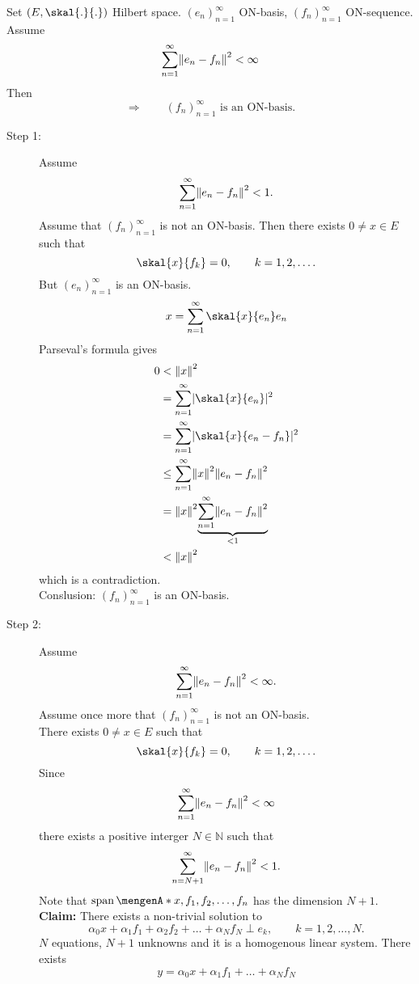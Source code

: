 \begin{example}
	Set $(E,\skal{.}{.})$ Hilbert space. $(e_n)_{n=1}^{\infty}$ ON-basis, $(f_n)_{n=1}^{\infty}$ ON-sequence. \\
	Assume 
	\[
		\sum_{n=1}^{\infty}\norm{e_n-f_n}^2 < \infty
	\] 
	Then
	\[
		\Rightarrow \qquad (f_n)_{n=1}^{\infty} \text{ is an ON-basis.}
	\]
\end{example}
\begin{beweis}
	\begin{description}
		\item[Step 1:] Assume 
		\[
			\sum_{n=1}^{\infty}\norm{e_n - f_n}^2 < 1.
		\] 
		Assume that $(f_n)_{n=1}^{\infty}$ is not an ON-basis. Then there exists $0 \neq x \in E$ such that
		\[
			\skal{x}{f_k} = 0, \qquad  k =1,2,\dots.
		\]
		But $(e_n)_{n=1}^{\infty}$ is an ON-basis. 
		\[
			x= \sum_{n=1}^{\infty} \skal{x}{e_n}e_n
		\]
		Parseval's formula gives
		\begin{align*}
				0 &< \norm{x}^2 \\ &= \sum_{n=1}^{\infty}\abs{\skal{x}{e_n}}^2 \\& = \sum_{n=1}^{\infty}\abs{\skal{x}{e_n-f_n}}^2 \\
				&\leq  \sum_{n=1}^{\infty}\norm{x}^2 \norm{e_n-f_n}^2 \\
				&= \norm{x}^2 \underset{< 1}{\underbrace{\sum_{n=1}^{\infty}\norm{e_n -f_n }^2}} \\
				&< \norm{x}^2
		\end{align*}
		which is a contradiction. \\
		Conslusion: $(f_n)_{n=1}^{\infty}$ is an ON-basis.
		\item[Step 2:] Assume 
		\[
			\sum_{n=1}^{\infty}\norm{e_n-f_n}^2 < \infty.
		\]
		Assume once more that $(f_n)_{n=1}^{\infty}$ is not an ON-basis. \\
		There exists $0 \neq x \in E$ such that 
		\[
			\skal{x}{f_k} = 0, \qquad k=1,2,\dots.
		\]
		Since \[
			\sum_{n=1}^{\infty} \norm{e_n-f_n}^2 < \infty
		\]
		there exists a positive interger $N \in \mathbb{N}$ such that
		\[
			\sum_{n=N+1}^{\infty} \norm{e_n-f_n}^2 < 1.
		\]
		Note that $\spn \set{x,f_1,f_2,\dots,f_n}$ has the dimension $N+1$. \\
		\textbf{Claim:} \text{    }There exists a non-trivial solution to 
		\[
			\alpha_0 x + \alpha_1 f_1 + \alpha_2 f_2 + \dots + \alpha_N f_N \perp e_k, \qquad k=1,2,\dots,N.
		\]
		$N$ equations, $N+1$ unknowns and it is a homogenous linear system. There exists 
		\[
			y = \alpha_0 x + \alpha_1 f_1 + \dots + \alpha_N f_N
\]
\end{description}
\end{beweis}
